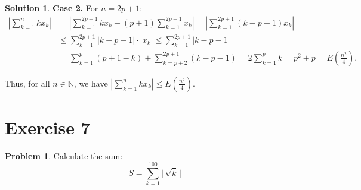 \documentclass{article}
\theoremstyle{definition}
\newtheorem{problem}{Problem}
\newtheorem*{solution}{Solution}
\begin{document}
\begin{solution}
\textbf{Case 2.} For $n = 2p+1$:
\begin{align*}
\left|\sum_{k=1}^n kx_k\right| &= \left|\sum_{k=1}^{2p+1} kx_k - (p+1)\sum_{k=1}^{2p+1} x_k\right| = \left|\sum_{k=1}^{2p+1} (k-p-1)x_k\right| \\
&\leq \sum_{k=1}^{2p+1} |k-p-1| \cdot |x_k| \leq \sum_{k=1}^{2p+1} |k-p-1| \\
&= \sum_{k=1}^p (p+1-k) + \sum_{k=p+2}^{2p+1} (k-p-1) = 2\sum_{k=1}^p k = p^2 + p = E\left(\frac{n^2}{4}\right).
\end{align*}

Thus, for all $n \in \mathbb{N}$, we have $\left|\sum_{k=1}^n kx_k\right| \leq E\left(\frac{n^2}{4}\right)$.
\end{solution}

\section*{Exercise 7}

\begin{problem}
Calculate the sum:
\[
S = \sum_{k=1}^{100} \lfloor \sqrt{k} \rfloor
\]
\end{problem}
\end{document}
